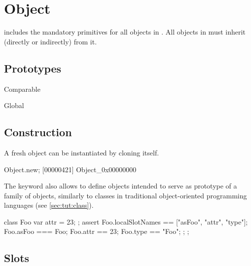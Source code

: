 
\section{Object}

 includes the mandatory primitives for all objects in \us.
All objects in \us must inherit (directly or indirectly) from it.

\subsection{Prototypes}

\begin{refObjects}
\item[Comparable]
\item[Global]
\end{refObjects}

\subsection{Construction}

A fresh object can be instantiated by cloning  itself.

\begin{urbiscript}[firstnumber=1]
Object.new;
[00000421] Object_0x00000000
\end{urbiscript}

The keyword  also allows to define objects intended to serve
as prototype of a family of objects, similarly to classes in traditional
object-oriented programming languages (see \autoref{sec:tut:class}).

\begin{urbiscript}
{
  class Foo
  {
    var attr = 23;
  };
  assert
  {
    Foo.localSlotNames == ["asFoo", "attr", "type"];
    Foo.asFoo === Foo;
    Foo.attr == 23;
    Foo.type == "Foo";
  };
};
\end{urbiscript}


\subsection{Slots}

